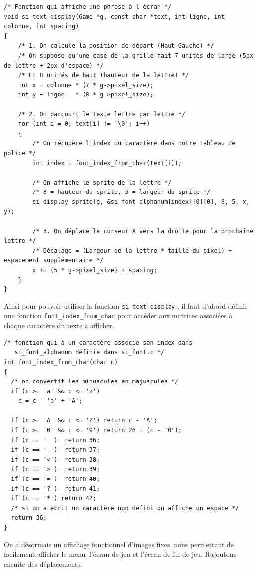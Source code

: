 \documentclass[12pt,a4paper]{report}
\begin{document}
\begin{lstlisting}
/* Fonction qui affiche une phrase à l'écran */
void si_text_display(Game *g, const char *text, int ligne, int colonne, int spacing)
{
    /* 1. On calcule la position de départ (Haut-Gauche) */
    /* On suppose qu'une case de la grille fait 7 unités de large (5px de lettre + 2px d'espace) */
    /* Et 8 unités de haut (hauteur de la lettre) */
    int x = colonne * (7 * g->pixel_size); 
    int y = ligne   * (8 * g->pixel_size);

    /* 2. On parcourt le texte lettre par lettre */
    for (int i = 0; text[i] != '\0'; i++) 
    {
        /* On récupère l'index du caractère dans notre tableau de police */
        int index = font_index_from_char(text[i]);

        /* On affiche le sprite de la lettre */
        /* 8 = hauteur du sprite, 5 = largeur du sprite */
        si_display_sprite(g, &si_font_alphanum[index][0][0], 8, 5, x, y);

        /* 3. On déplace le curseur X vers la droite pour la prochaine lettre */
        /* Décalage = (Largeur de la lettre * taille du pixel) + espacement supplémentaire */
        x += (5 * g->pixel_size) + spacing;
    }
}
\end{lstlisting}
\vspace{0.5cm}

Ainsi pour pouvoir utiliser la fonction \texttt{si\_text\_display} , il faut d'abord définir une fonction \texttt{font\_index\_from\_char} pour accéder aux matrices associées à chaque caractère du texte à afficher.
\vspace{0.5cm}

\begin{lstlisting}
/* fonction qui à un caractère associe son index dans
   si_font_alphanum définie dans si_font.c */
int font_index_from_char(char c) 
{
  /* on convertit les minuscules en majuscules */
  if (c >= 'a' && c <= 'z')
    c = c - 'a' + 'A';
    
  if (c >= 'A' && c <= 'Z') return c - 'A';
  if (c >= '0' && c <= '9') return 26 + (c - '0');
  if (c == ' ')  return 36;
  if (c == '-')  return 37;
  if (c == '<')  return 38;
  if (c == '>')  return 39;
  if (c == '=')  return 40;
  if (c == '?')  return 41;
  if (c == '*') return 42;
  /* si on a ecrit un caractère non défini on affiche un espace */
  return 36;
}
\end{lstlisting}

On a désormais un affichage fonctionnel d'images fixes, nous permettant de facilement afficher le menu, l'écran de jeu et l'écran de fin de jeu. Rajoutons ensuite des déplacements.
\end{document}
